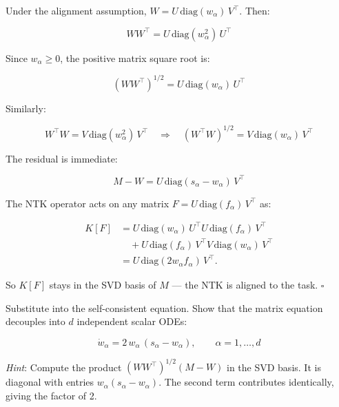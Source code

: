\documentclass[11pt]{article}
\begin{document}
\begin{solution}[ex:td-3ai]
Under the alignment assumption,
\(W = U\,\text{diag}(w_\alpha)\,V^\top\). Then:

\[WW^\top = U\,\text{diag}(w_\alpha^2)\,U^\top\]

Since \(w_\alpha \geq 0\), the positive matrix square root is:

\[(WW^\top)^{1/2} = U\,\text{diag}(w_\alpha)\,U^\top\]

Similarly:

\[W^\top W = V\,\text{diag}(w_\alpha^2)\,V^\top \quad \Longrightarrow \quad (W^\top W)^{1/2} = V\,\text{diag}(w_\alpha)\,V^\top\]

The residual is immediate:

\[M - W = U\,\text{diag}(s_\alpha - w_\alpha)\,V^\top\]

The NTK operator acts on any matrix
\(F = U\,\text{diag}(f_\alpha)\,V^\top\) as:

\[
\begin{aligned}
K[F]
&=
U\,\text{diag}(w_\alpha)\,U^\top
U\,\text{diag}(f_\alpha)\,V^\top \\
&\quad
+ U\,\text{diag}(f_\alpha)\,V^\top
V\,\text{diag}(w_\alpha)\,V^\top \\
&=
U\,\text{diag}(2w_\alpha f_\alpha)\,V^\top.
\end{aligned}
\]

So \(K[F]\) stays in the SVD basis of \(M\) --- the NTK is aligned to
the task. \(\square\)
\end{solution}

\begin{exercise}
\label{ex:td-3aii}
Substitute into the self-consistent equation. Show that
the matrix equation decouples into \(d\) independent scalar ODEs:

\[\dot{w}_\alpha = 2\,w_\alpha\,(s_\alpha - w_\alpha), \qquad \alpha = 1, \ldots, d\]

\emph{Hint}: Compute the product \((WW^\top)^{1/2}(M - W)\) in the SVD
basis. It is diagonal with entries \(w_\alpha(s_\alpha - w_\alpha)\).
The second term contributes identically, giving the factor of 2.
\end{exercise}
\end{document}
